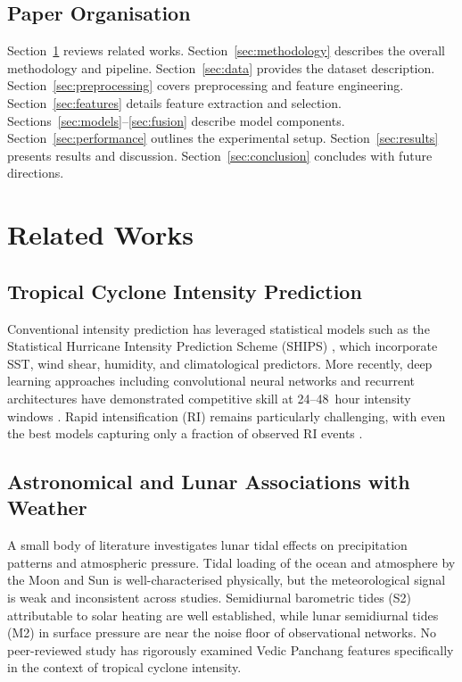 \documentclass[12pt,a4paper]{article}
\begin{document}
    \subsection{Paper Organisation}

    Section~\ref{sec:related} reviews related works. Section~\ref{sec:methodology}
    describes the overall methodology and pipeline. Section~\ref{sec:data} provides
    the dataset description. Section~\ref{sec:preprocessing} covers preprocessing
    and feature engineering. Section~\ref{sec:features} details feature extraction
    and selection. Sections~\ref{sec:models}--\ref{sec:fusion} describe model
    components. Section~\ref{sec:performance} outlines the experimental setup.
    Section~\ref{sec:results} presents results and discussion. Section~\ref{sec:conclusion}
    concludes with future directions.

    \section{Related Works}
    \label{sec:related}

    \subsection{Tropical Cyclone Intensity Prediction}

    Conventional intensity prediction has leveraged statistical models such as
    the Statistical Hurricane Intensity Prediction Scheme (SHIPS) \cite{demaria2014advances},
    which incorporate SST, wind shear, humidity, and climatological predictors.
    More recently, deep learning approaches including convolutional neural networks
    and recurrent architectures have demonstrated competitive skill at 24--48~hour
    intensity windows \cite{zhang2018tropical}. Rapid intensification (RI) remains
    particularly challenging, with even the best models capturing only a fraction
    of observed RI events \cite{kaplan2003}.

    \subsection{Astronomical and Lunar Associations with Weather}

    A small body of literature investigates lunar tidal effects on precipitation
    patterns and atmospheric pressure. Tidal loading of the ocean and atmosphere
    by the Moon and Sun is well-characterised physically, but the meteorological
    signal is weak and inconsistent across studies. Semidiurnal barometric tides
    (S2) attributable to solar heating are well established, while lunar semidiurnal
    tides (M2) in surface pressure are near the noise floor of observational
    networks. No peer-reviewed study has rigorously examined Vedic Panchang features
    specifically in the context of tropical cyclone intensity.
\end{document}
